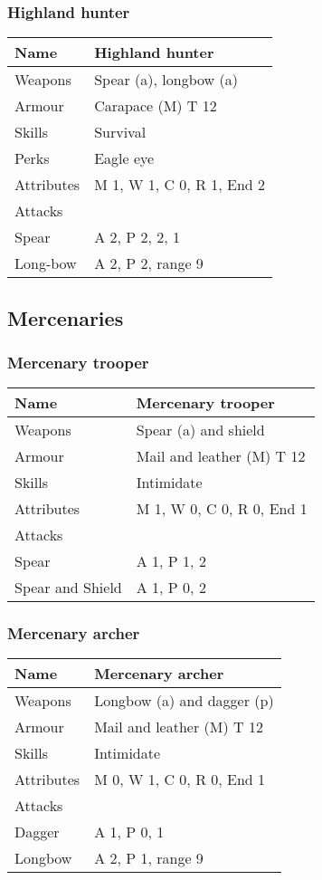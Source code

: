 \documentclass[a4paper,11pt,oneside]{book}
\newcommand{\textlf}[1]{\textbf{\titlecap{#1}}}
\begin{document}
\subsubsection{Highland hunter}
\begin{tabular}{|l|l|}
	\hline
	Name & Highland hunter\\
	\hline
	Weapons & Spear (a), longbow (a)\\
	Armour & Carapace (M) T 12\\
	Skills & Survival\\
	Perks & Eagle eye \\
	Attributes & M 1, W 1, C 0, R 1, End 2\\ 
	\hline
	Attacks & \\
	\hline
	Spear & A 2, P 2, \textlf{Rending} 2, \textlf{Reach} 1 \\
	Long-bow & A 2, P 2, range 9\\
	\hline
\end{tabular}

\subsection{Mercenaries}

\subsubsection{Mercenary trooper}
\begin{tabular}{|l|l|}
	\hline
	Name & Mercenary trooper\\
	\hline
	Weapons & Spear (a) and shield\\
	Armour & Mail and leather (M) T 12\\
	Skills & Intimidate\\
	Attributes & M 1, W 0, C 0, R 0, End 1\\
	\hline
	Attacks & \\
	\hline
 	Spear & A 1, P 1, \textlf{Rending} 2\\
	Spear and Shield & A 1, P 0, \textlf{Rending} 2\\
	\hline
\end{tabular}

\subsubsection{Mercenary archer}
\begin{tabular}{|l|l|}
	\hline
	Name & Mercenary archer\\
	\hline
	Weapons & Longbow (a) and dagger (p)\\
	Armour & Mail and leather (M) T 12\\
	Skills & Intimidate\\
	Attributes & M 0, W 1, C 0, R 0, End 1\\
	\hline
	Attacks & \\
	\hline
	Dagger & A 1, P 0, \textlf{Rending} 1\\
	Longbow & A 2, P 1, range 9\\
	\hline
\end{tabular}
\end{document}
